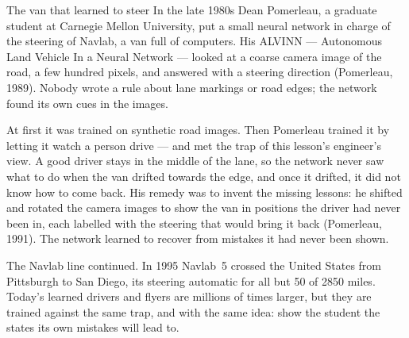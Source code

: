 \begin{curiosity}{The van that learned to steer}
In the late 1980s Dean Pomerleau, a graduate student at Carnegie Mellon University, put a small neural network in charge of the steering of Navlab, a van full of computers. His ALVINN — Autonomous Land Vehicle In a Neural Network — looked at a coarse camera image of the road, a few hundred pixels, and answered with a steering direction (Pomerleau, 1989). Nobody wrote a rule about lane markings or road edges; the network found its own cues in the images.

At first it was trained on synthetic road images. Then Pomerleau trained it by letting it watch a person drive — and met the trap of this lesson's engineer's view. A good driver stays in the middle of the lane, so the network never saw what to do when the van drifted towards the edge, and once it drifted, it did not know how to come back. His remedy was to invent the missing lessons: he shifted and rotated the camera images to show the van in positions the driver had never been in, each labelled with the steering that would bring it back (Pomerleau, 1991). The network learned to recover from mistakes it had never been shown.

The Navlab line continued. In 1995 Navlab~5 crossed the United States from Pittsburgh to San Diego, its steering automatic for all but 50 of 2850 miles. Today's learned drivers and flyers are millions of times larger, but they are trained against the same trap, and with the same idea: show the student the states its own mistakes will lead to.
\end{curiosity}

